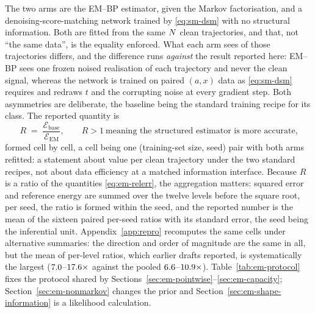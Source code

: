 The two arms are the EM--BP estimator, given the Markov factorisation, and a
denoising-score-matching network trained by \eqref{eq:sm-dsm} with no
structural information. Both are fitted from the same $N$ clean
trajectories, and that, not ``the same data'', is the equality enforced.
What each arm sees of those trajectories differs, and the difference runs
\emph{against} the result reported here: EM--BP sees one frozen noised
realisation of each trajectory and never the clean signal, whereas the
network is trained on paired $(a,x)$ data as \eqref{eq:sm-dsm} requires and
redraws $t$ and the corrupting noise at every gradient step. Both asymmetries
are deliberate, the baseline being the standard training recipe for its
class. The reported quantity is
\begin{equation}
  R \;=\; \frac{\mathcal{E}_{\mathrm{base}}}{\mathcal{E}_{\mathrm{EM}}},
  \qquad R > 1 \ \text{meaning the structured estimator is more accurate,}
  \label{eq:em-ratio}
\end{equation}
formed cell by cell, a cell being one (training-set size, seed) pair with both
arms refitted: a statement about value per clean trajectory under the two
standard recipes, not about data efficiency at a matched information
interface. Because $R$ is a ratio of the quantities \eqref{eq:em-relerr}, the
aggregation matters: squared error and reference energy are summed over the
twelve levels before the square root, per seed, the ratio is formed within
the seed, and the reported number is the mean of the sixteen paired per-seed
ratios with its standard error, the seed being the inferential unit.
Appendix~\ref{app:repro} recomputes the same cells under alternative
summaries: the direction and order of magnitude are the same in all, but the
mean of per-level ratios, which earlier drafts reported, is systematically
the largest ($7.0$--$17.6\times$ against the pooled
$6.6$--$10.9\times$). Table~\ref{tab:em-protocol} fixes the protocol
shared by Sections~\ref{sec:em-pointwise}--\ref{sec:em-capacity};
Section~\ref{sec:em-nonmarkov} changes the prior and
Section~\ref{sec:em-shape-information} is a likelihood calculation.

